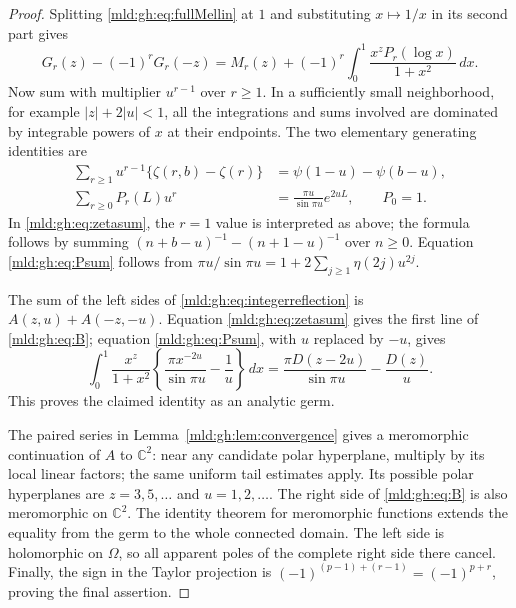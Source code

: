 \begin{proof}
Splitting \eqref{mld:gh:eq:fullMellin} at $1$ and substituting $x\mapsto1/x$
in its second part gives
\begin{equation}\label{mld:gh:eq:integerreflection}
 G_r(z)-(-1)^rG_r(-z)
 =M_r(z)+(-1)^r\int_0^1\frac{x^zP_r(\log x)}{1+x^2}\,dx.
\end{equation}
Now sum with multiplier $u^{r-1}$ over $r\geq1$. In a sufficiently
small neighborhood, for example $|z|+2|u|<1$, all the integrations and
sums involved are dominated by integrable powers of $x$ at their
endpoints. The two elementary generating identities are
\begin{align}
 \sum_{r\geq1}u^{r-1}\{\zeta(r,b)-\zeta(r)\}
   &=\psi(1-u)-\psi(b-u),\label{mld:gh:eq:zetasum}\\
 \sum_{r\geq0}P_r(L)u^r
   &=\frac{\pi u}{\sin\pi u}e^{2uL},
       \qquad P_0=1.\label{mld:gh:eq:Psum}
\end{align}
In \eqref{mld:gh:eq:zetasum}, the $r=1$ value is interpreted as above;
the formula follows by summing
$(n+b-u)^{-1}-(n+1-u)^{-1}$ over $n\geq0$.
Equation \eqref{mld:gh:eq:Psum} follows from
$\pi u/\sin\pi u=1+2\sum_{j\geq1}\eta(2j)u^{2j}$.

The sum of the left sides of \eqref{mld:gh:eq:integerreflection} is
$A(z,u)+A(-z,-u)$. Equation \eqref{mld:gh:eq:zetasum} gives the first
line of \eqref{mld:gh:eq:B}; equation \eqref{mld:gh:eq:Psum}, with $u$
replaced by $-u$, gives
\[
 \int_0^1\frac{x^z}{1+x^2}
   \left\{\frac{\pi x^{-2u}}{\sin\pi u}-\frac1u\right\}\,dx
 =\frac{\pi D(z-2u)}{\sin\pi u}-\frac{D(z)}u.
\]
This proves the claimed identity as an analytic germ.

The paired series in Lemma~\ref{mld:gh:lem:convergence} gives a meromorphic
continuation of $A$ to $\mathbb C^2$: near any candidate polar
hyperplane, multiply by its local linear factors; the same uniform
tail estimates apply. Its possible polar hyperplanes are
$z=3,5,\ldots$ and $u=1,2,\ldots$.
The right side of \eqref{mld:gh:eq:B} is also meromorphic on $\mathbb C^2$.
The identity theorem for meromorphic functions extends the equality
from the germ to the whole connected domain. The left side is
holomorphic on $\Omega$, so all apparent poles of the complete
right side there cancel. Finally, the sign in the Taylor projection
is $(-1)^{(p-1)+(r-1)}=(-1)^{p+r}$, proving the final assertion.
\end{proof}

